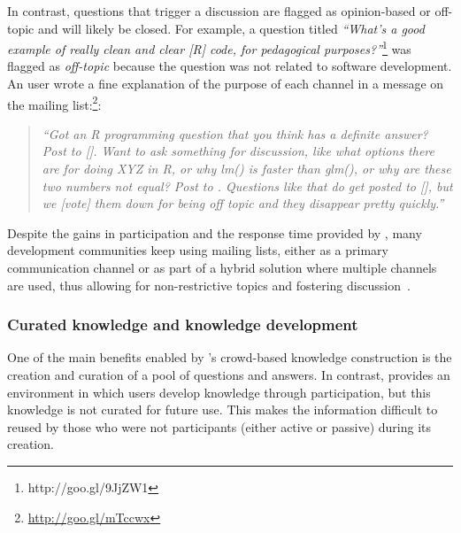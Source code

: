 In contrast, \SO questions that trigger a discussion are flagged as opinion-based or off-topic and will likely be closed. 
For example, a question titled \textit{``What's a good example of really clean and clear [R] code, for pedagogical purposes?''}\footnote{http://goo.gl/9JjZW1} was flagged as \textit{off-topic} because the question was not related to software development.
An \RH user wrote a fine explanation of the purpose of each channel in a message on the mailing list:\footnote{\url{http://goo.gl/mTccwx}}:
    \begin{quote}
        \textit{``Got an R programming question that you think has a definite answer? Post to [\SO]. Want to ask something for discussion, like what options there are for doing XYZ in R, or why lm() is faster than glm(), or why are these two numbers not equal? Post to \RH. Questions like that do get posted to [\SO], but we [vote] them down for being off topic and they disappear pretty quickly.''}
    \end{quote}

Despite the gains in participation and the response time provided by \SO, many development communities keep using mailing lists, either as a primary communication channel or as part of a hybrid solution where multiple channels are used, thus allowing for non-restrictive topics and fostering discussion~\cite{Squire2015a}.


\subsubsection{Curated knowledge and knowledge development}

One of the main benefits enabled by \SO's crowd-based knowledge construction is the creation and curation of a pool of questions and answers. In contrast, \RH provides an environment in which users
    develop knowledge through participation, but this knowledge is not curated for future use. This makes the information difficult to reused by those who were not
    participants (either active or passive) during its creation.


